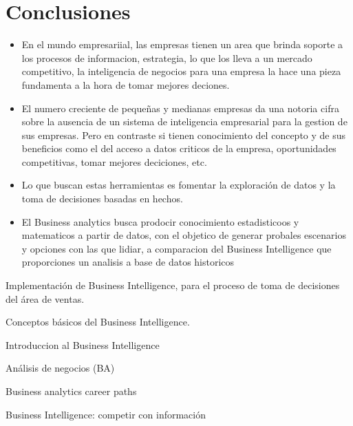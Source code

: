 \documentclass[twoside,twocolumn]{article}
\begin{document}
\section{Conclusiones}
\begin{itemize}	

	\item  En el mundo empresariial, las empresas tienen un area que brinda soporte a los procesos de informacion, estrategia, lo que los lleva a un mercado competitivo, la inteligencia de negocios para una empresa la hace una pieza fundamenta a la hora de tomar mejores deciones.
	\item El numero creciente de pequeñas y medianas empresas da una notoria cifra sobre la ausencia de un sistema de inteligencia empresarial para la gestion de sus empresas. Pero en contraste si tienen conocimiento del concepto y de sus beneficios como el del acceso a datos criticos de la empresa, oportunidades competitivas, tomar mejores deciciones, etc.
	\item Lo que buscan estas herramientas es fomentar la exploración de datos y la toma de decisiones basadas en hechos.
	\item El Business analytics busca prodocir conocimiento estadisticoos y matematicos a partir de datos, con el objetico de generar probales escenarios y opciones con las que lidiar, a comparacion del Business Intelligence que proporciones un analisis a base de datos historicos

\end{itemize} 





\begin{thebibliography}{99} 

\newblock Implementación de Business Intelligence, para el proceso de toma de decisiones del área de ventas.

Conceptos básicos del Business Intelligence.

\newblock Introduccion al Business Intelligence

\newblock Análisis de negocios (BA)

\newblock Business analytics career paths

\newblock Business Intelligence: competir con información
 

 
\end{thebibliography}


\end{document}
